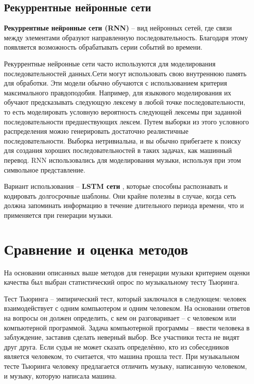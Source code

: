 \subsection{Рекуррентные нейронные сети}

\textbf{Рекуррентные нейронные сети (RNN)} \cite{rnn} -- вид нейронных сетей, где связи между элементами образуют направленную последовательность. Благодаря этому появляется возможность обрабатывать серии событий во времени.

Рекуррентные нейронные сети часто используются для моделирования последовательностей данных.Сети могут использовать свою внутреннюю память для обработки. Эти модели обычно обучаются с использованием критерия максимального правдоподобия. Например, для языкового моделирования их обучают предсказывать следующую лексему в любой точке последовательности, то есть моделировать условную вероятность следующей лексемы при заданной последовательности предшествующих лексем. Путем выборки из этого условного распределения можно генерировать достаточно реалистичные последовательности. Выборка нетривиальна, и вы обычно прибегаете к поиску для создания хороших последовательностей в таких задачах, как машинный перевод. RNN использовались для моделирования музыки, используя при этом символьное представление.

Вариант использования -- \textbf{LSTM сети} \cite{lstm}, которые способны распознавать и кодировать долгосрочные шаблоны. Они крайне полезны в случае, когда сеть должна запоминать информацию в течение длительного периода времени, что и применяется при генерации музыки.


\section{Сравнение и оценка методов}

На основании описанных выше методов  для генерации музыки критерием оценки качества был выбран статистический опрос по музыкальному тесту Тьюринга.

Тест Тьюринга -- эмпирический тест, который заключался в следующем: человек взаимодействует с одним компьютером и одним человеком. На основании ответов на вопросы он должен определить, с кем он разговаривает -- с человеком или компьютерной программой. Задача компьютерной программы -- ввести человека в заблуждение, заставив сделать неверный выбор. Все участники теста не видят друг друга. Если судья не может сказать определённо, кто из собеседников является человеком, то считается, что машина прошла тест. При музыкальном тесте Тьюринга человеку предлагается отличить музыку, написанную человеком, и музыку, которую написала машина.

